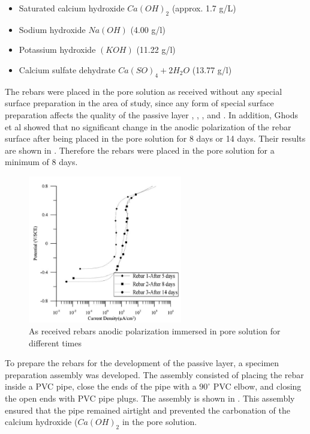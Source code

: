 \begin{itemize}
	\item Saturated calcium hydroxide $Ca(OH)_2$ (approx. 1.7 g/L)
	\item Sodium hydroxide $Na(OH)$ (4.00 g/l)
	\item Potassium hydroxide $(KOH)$ (11.22 g/l)
	\item Calcium sulfate dehydrate $Ca(SO)_4 + 2H_2O$ (13.77 g/l)
\end{itemize}

The rebars were placed in the pore solution as received without any special surface preparation in the area of study, since any form of special surface preparation affects the quality of the passive layer \cite{Andersson1989}, \cite{DawnMarcotte2001}, \cite{Moragues1987}, and \cite{Page1983}. In addition, Ghods et al showed that no significant change in the anodic polarization of the rebar surface after being placed in the pore solution for 8 days or 14 days. Their results are shown in . Therefore the rebars were placed in the pore solution for a minimum of 8 days. 

\begin{figure}[htbp]
	\centering
	\includegraphics[width=0.6\textwidth]{Chapter-3/figs/AsReceived_AnodicPolarization_time}
	\caption{As received rebars anodic polarization immersed in pore solution for different times\cite{Ghods2009}}
	\label{fig:GhodsRebarPassivation}
\end{figure}

To prepare the rebars for the development of the passive layer, a specimen preparation assembly was developed. The assembly consisted of placing the rebar inside a PVC pipe, close the ends of the pipe  with a $90^{\circ}$ PVC elbow, and closing the open ends with PVC pipe plugs. The assembly is shown in . This assembly ensured that the pipe remained airtight and prevented the carbonation of the calcium hydroxide ($Ca(OH)_{2}$ in the pore solution.

